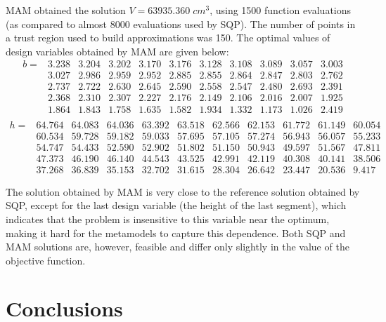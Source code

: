\documentclass[runningheads,a4paper]{llncs}
\begin{document}
MAM obtained the solution $V = 63935.360\; cm^3$, using 1500 function evaluations (as compared to almost 8000 evaluations used by SQP). The number of points in a trust region used to build approximations was 150. The optimal values of design variables obtained by MAM are given below:
\[
\begin{matrix}
	b=&	3.238&3.204&3.202&3.170&3.176&3.128&3.108&3.089&3.057&3.003 \\  
		& 3.027&2.986&2.959&2.952&2.885&2.855&2.864&2.847&2.803&2.762 \\  
		& 2.737&2.722&2.630&2.645&2.590&2.558&2.547&2.480&2.693&2.391 \\ 
		& 2.368&2.310&2.307&2.227&2.176&2.149&2.106&2.016&2.007&1.925 \\  
		& 1.864&1.843&1.758&1.635&1.582&1.934&1.332&1.173&1.026&2.419 \\ 
\end{matrix}
\]
\[
\begin{matrix}
	h=& 64.764&64.083&64.036&63.392&63.518&62.566&62.153&61.772&61.149& 60.054  \\
		& 60.534&59.728&59.182&59.033&57.695&57.105&57.274&56.943&56.057&55.233  \\
		& 54.747&54.433&52.590&52.902&51.802&51.150&50.943&49.597&51.567&47.811  \\
		& 47.373&46.190&46.140&44.543&43.525&42.991&42.119&40.308&40.141&38.506  \\
		& 37.268&36.839&35.153&32.702&31.615&28.304&26.642&23.447&20.536& 9.417

\end{matrix}
\]


The solution obtained by MAM is very close to the reference solution obtained by SQP, except for the last design variable (the height of the last segment), which indicates that the problem is insensitive to this variable near the optimum, making it hard for the metamodels to capture this dependence. Both SQP and MAM solutions are, however, feasible and differ only slightly in the value of the objective function.


\section{Conclusions}


{}

\end{document}
